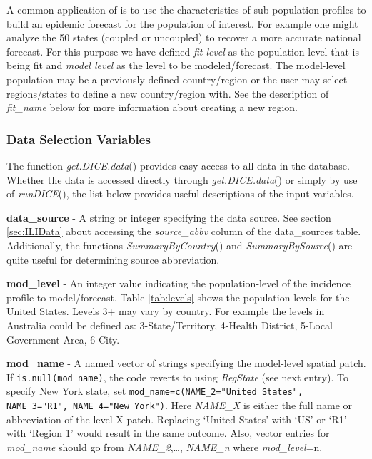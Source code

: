 \documentclass[a4paper]{article}
\begin{document}
A common application of  is to use the characteristics of sub-population profiles to build an epidemic forecast for the population of interest.  For example one might analyze the 50 states (coupled or uncoupled) to recover a more accurate national forecast.  For this purpose we have defined \textit{fit level} as the population level that is being fit and \textit{model level} as the level to be modeled/forecast.  The model-level population may be a previously defined country/region or the user may select regions/states to define a new country/region with.  See the description of \textit{fit\_name} below for more information about creating a new region.

\subsubsection*{Data Selection Variables}
The function \textit{get.DICE.data}() provides easy access to all data in the  database.  Whether the data is accessed directly through \textit{get.DICE.data}() or simply by use of \textit{runDICE}(), the list below provides useful descriptions of the input variables.

 \textbf{data\_source} - A string or integer specifying the data source. See section \ref{sec:ILIData} about accessing the \textit{source\_abbv} column of the data\_sources table. Additionally, the  functions \textit{SummaryByCountry}() and \textit{SummaryBySource}() are quite useful for determining source abbreviation.

 \textbf{mod\_level} - An integer value indicating the population-level of the incidence profile to model/forecast.  Table \ref{tab:levels} shows the population levels for the United States.  Levels 3+ may vary by country.  For example the levels in Australia could be defined as: 3-State/Territory, 4-Health District, 5-Local Government Area, 6-City.

 \textbf{mod\_name} - A named vector of strings specifying the model-level spatial patch.  If \verb|is.null(mod_name)|, the code reverts to using \textit{RegState} (see next entry).  To specify New York state, set \verb|mod_name=c(NAME_2="United States", NAME_3="R1", NAME_4="New York")|. Here \textit{NAME\_X} is either the full name or abbreviation of the level-X patch. Replacing `United States' with `US' or `R1' with `Region 1' would result in the same outcome.  Also, vector entries for \textit{mod\_name} should go from \textit{NAME\_2},\ldots, \textit{NAME\_n} where \textit{mod\_level}=n.
\end{document}
